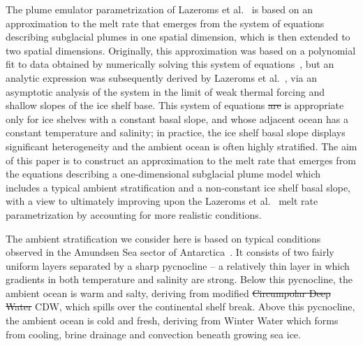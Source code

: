\documentclass[openacc]{rsproca_new}%
\newcommand{\red}[1]{{\color{red} #1}}
\newcommand{\blue}[1]{{\color{blue} #1}}
\newcommand{\rout}[1]{\red{\st{#1}}}\newcommand{\ab}[1]{\textcolor{Green}{#1}}\newcommand{\about}[1]{\textcolor{Cyan}{\sout{#1}}}
\begin{document}
The plume emulator parametrization of Lazeroms et al.~\cite{Lazeroms2018TheCryo} is based on an approximation to the melt rate that emerges from the system of equations describing subglacial plumes in one spatial dimension, which is then extended to two spatial dimensions. Originally, this approximation was based on a polynomial fit to data obtained by numerically solving this system of equations~\cite{Jenkins2014scaling}, but an analytic expression was subsequently derived by Lazeroms et al.~\cite{Lazeroms2019JPhysOcean}, via an asymptotic analysis of the system in the limit of weak thermal forcing and shallow slopes of the ice shelf base. This system of equations \rout{are }\blue{is} appropriate only for ice shelves with a constant basal slope, and whose adjacent ocean has a constant temperature and salinity; in practice, the ice shelf basal slope displays significant heterogeneity and the ambient ocean is often highly stratified. The aim of this paper is to construct an approximation to the melt rate that emerges from the equations describing a one-dimensional subglacial plume model which includes a typical ambient stratification and a non-constant ice shelf basal slope, with a view to ultimately improving upon the Lazeroms et al.~\cite{Lazeroms2018TheCryo} melt rate parametrization by accounting for more realistic conditions.

The ambient stratification we consider here is based on typical conditions observed in the Amundsen Sea sector of Antarctica~\cite{Jenkins2018NatureGeo}. It consists of two fairly uniform layers separated by a sharp pycnocline -- a relatively thin layer in which gradients in both temperature and salinity are strong. Below this pycnocline, the ambient ocean is warm and salty, deriving from modified \rout{Circumpolar Deep Water}\blue{CDW}, which spills over the continental shelf break. Above this pycnocline, the ambient ocean is cold and fresh, deriving from Winter Water which forms from cooling, brine drainage and convection beneath growing sea ice.
\end{document}
